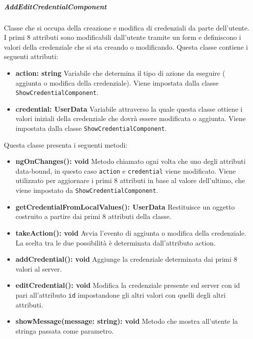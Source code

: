 \subparagraph{AddEditCredentialComponent}
Classe che si occupa della creazione e modifica di credenziali da parte dell'utente. I primi 8 attributi sono modificabili dall'utente tramite un form e definiscono i valori della credenziale che si sta creando o modificando. \newline
Questa classe contiene i seguenti attributi:
\begin{itemize}
	\item \textbf{action: string} \newline
	Variabile che determina il tipo di azione da eseguire ( aggiunta o modifica della credenziale). Viene impostata dalla classe \texttt{ShowCredentialComponent}.
	\item \textbf{credential: UserData} \newline
	Variabile attraverso la quale questa classe ottiene i valori iniziali della credenziale che dovrà essere modificata o aggiunta. Viene impostata dalla classe \texttt{ShowCredentialComponent}.
\end{itemize}
Questa classe presenta i seguenti metodi:
\begin{itemize}
	\item \textbf{ngOnChanges(): void} \newline
	Metodo chiamato ogni volta che uno degli attributi data-bound, in questo caso \texttt{action} e \texttt{credential} viene modificato. Viene utilizzato per aggiornare i primi 8 attributi in base al valore dell'ultimo, che viene impostato da \texttt{ShowCredentialComponent}.
	\item \textbf{getCredentialFromLocalValues(): UserData} \newline
	Restituisce un oggetto costruito a partire dai primi 8 attributi della classe.
	\item \textbf{takeAction(): void} \newline
	Avvia l'evento di aggiunta o modifica della credenziale. La scelta tra le due possibilità è determinata dall'attributo action.
	\item \textbf{addCredential(): void} \newline
	Aggiunge la credenziale determinata dai primi 8 valori al server.
	\item \textbf{editCredential(): void} \newline
	Modifica la credenziale presente sul server con id pari all'attributo \texttt{id} impostandone gli altri valori con quelli degli altri attributi.
	\item \textbf{showMessage(message: string): void} \newline
	Metodo che mostra all'utente la stringa passata come parametro.
\end{itemize}
